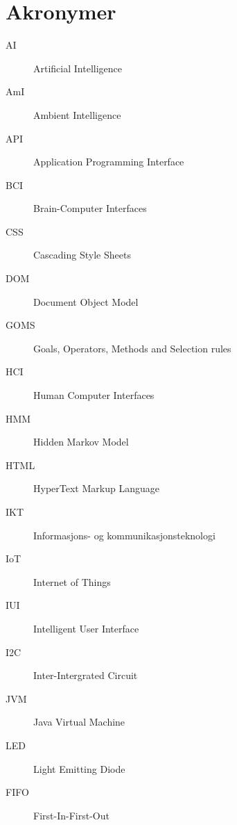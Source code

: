 \section{Akronymer}
\label{akronymer}
\begin{description}
\item[AI] Artificial Intelligence
\item[AmI] Ambient Intelligence
\item[API] Application Programming Interface
\item[BCI] Brain-Computer Interfaces
\item[CSS] Cascading Style Sheets
\item[DOM] Document Object Model
\item[GOMS] Goals, Operators, Methods and Selection rules
\item[HCI] Human Computer Interfaces
\item[HMM] Hidden Markov Model
\item[HTML] HyperText Markup Language
\item[IKT] Informasjons- og kommunikasjonsteknologi
\item[IoT] Internet of Things
\item[IUI] Intelligent User Interface
\item[I2C] Inter-Intergrated Circuit
\item[JVM] Java Virtual Machine
\item[LED] Light Emitting Diode
\item[FIFO] First-In-First-Out
\end{description}